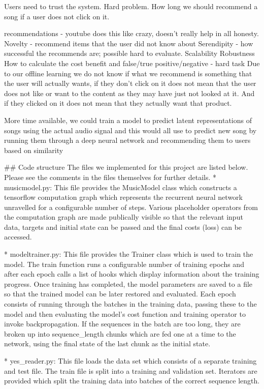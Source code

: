 \documentclass{article} %
\begin{document}
Users need to trust the system. Hard problem. How long we should recommend a song if a user does not click on it.

recommendations - youtube does this like crazy, doesn’t really help in all honesty.
Novelty - recommend items that the user did not know about
Serendipity - how successful the recommends are; possible hard to evaluate. 
Scalability 
Robustness
How to calculate the cost benefit and false/true positive/negative - hard task
Due to our offline learning we do not know if what we recommend is something that the user will actually wants, if they don’t click on it does not mean that the user does not like or want to the content as they may have just not looked at it. And if they clicked on it does not mean that they actually want that product.

More time available, we could train a model to predict latent representations of songs using the actual audio signal and this would all use to predict new song by running them through a deep neural network and recommending them to users based on similarity


## Code structure
The files we implemented for this project are listed below. Please see the comments in the files themselves for further details. 
* musicmodel.py: This file provides the MusicModel class which constructs a tensorflow computation graph which represents the recurrent neural network unravelled for a configurable number of steps. Various placeholder operators from the computation graph are made publically visible so that the relevant input data, targets and initial state can be passed and the final costs (loss) can be accessed. 

* modeltrainer.py: This file provides the Trainer class which is used to train the model. The train function runs a configurable number of training epochs and after each epoch calls a list of hooks which display information about the training progress. Once training has completed, the model parameters are saved to a file so that the trained model can be later restored and evaluated. Each epoch consists of running through the batches in the training data, passing these to the model and then evaluating the model's cost function and training operator to invoke backpropagation. If the sequences in the batch are too long, they are broken up into sequence_length chunks which are fed one at a time to the network, using the final state of the last chunk as the initial state. 

* yes_reader.py: This file loads the data set which consists of a separate training and test file. The train file is split into a training and validation set. Iterators are provided which split the training data into batches of the correct sequence length. 
\end{document}
